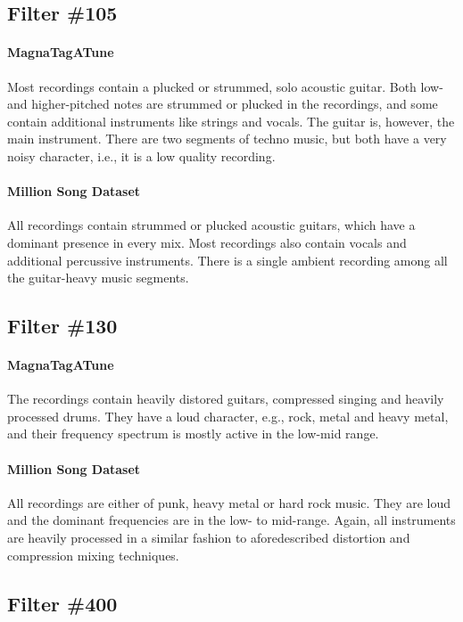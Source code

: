 \subsection*{Filter \#105}
\paragraph{MagnaTagATune}
Most recordings contain a plucked or strummed, solo acoustic guitar. Both low- and higher-pitched notes are strummed or plucked in the recordings, and some contain additional instruments like strings and vocals. The guitar is, however, the main instrument. There are two segments of techno music, but both have a very noisy character, i.e., it is a low quality recording. 

\paragraph{Million Song Dataset}
All recordings contain strummed or plucked acoustic guitars, which have a dominant presence in every mix. Most recordings also contain vocals and additional percussive instruments. There is a single ambient recording among all the guitar-heavy music segments.


\subsection*{Filter \#130}
\paragraph{MagnaTagATune}
The recordings contain heavily distored guitars,  compressed singing and heavily processed drums. They have a loud character, e.g., rock, metal and heavy metal, and their frequency spectrum is mostly active in the low-mid range.

\paragraph{Million Song Dataset}
All recordings are either of punk, heavy metal or hard rock music. They are loud and the dominant frequencies are in the low- to mid-range. Again, all instruments are heavily processed in a similar fashion to aforedescribed distortion and compression mixing techniques.


\subsection*{Filter \#400}
